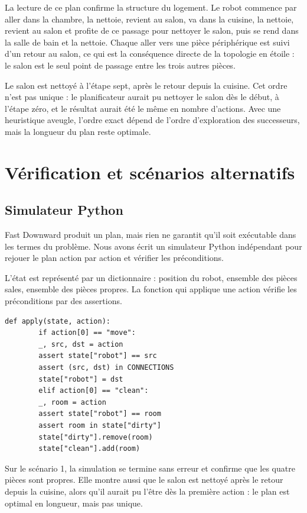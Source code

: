\documentclass[a4paper, 11pt]{report}
\begin{document}
	La lecture de ce plan confirme la structure du logement. Le robot commence
	par aller dans la chambre, la nettoie, revient au salon, va dans la cuisine,
	la nettoie, revient au salon et profite de ce passage pour nettoyer le
	salon, puis se rend dans la salle de bain et la nettoie. Chaque aller vers
	une pièce périphérique est suivi d'un retour au salon, ce qui est la
	conséquence directe de la topologie en étoile : le salon est le seul point
	de passage entre les trois autres pièces.
	
	Le salon est nettoyé à l'étape sept, après le retour depuis la cuisine.
	Cet ordre n'est pas unique : le planificateur aurait pu nettoyer le salon
	dès le début, à l'étape zéro, et le résultat aurait été le même en nombre
	d'actions. Avec une heuristique aveugle, l'ordre exact dépend de l'ordre
	d'exploration des successeurs, mais la longueur du plan reste optimale.
	
	\section{Vérification et scénarios alternatifs}
	
	\subsection{Simulateur Python}
	
	Fast Downward produit un plan, mais rien ne garantit qu'il soit exécutable
	dans les termes du problème. Nous avons écrit un simulateur Python
	indépendant pour rejouer le plan action par action et vérifier les
	préconditions.
	
	L'état est représenté par un dictionnaire : position du robot, ensemble des
	pièces sales, ensemble des pièces propres. La fonction qui applique une
	action vérifie les préconditions par des assertions.
	
	\begin{lstlisting}[style=python, caption={Application d'une action.}]
		def apply(state, action):
		if action[0] == "move":
		_, src, dst = action
		assert state["robot"] == src
		assert (src, dst) in CONNECTIONS
		state["robot"] = dst
		elif action[0] == "clean":
		_, room = action
		assert state["robot"] == room
		assert room in state["dirty"]
		state["dirty"].remove(room)
		state["clean"].add(room)
	\end{lstlisting}
	
	Sur le scénario 1, la simulation se termine sans erreur et confirme que les
	quatre pièces sont propres. Elle montre aussi que le salon est nettoyé
	après le retour depuis la cuisine, alors qu'il aurait pu l'être dès la
	première action : le plan est optimal en longueur, mais pas unique.
	
\end{document}
